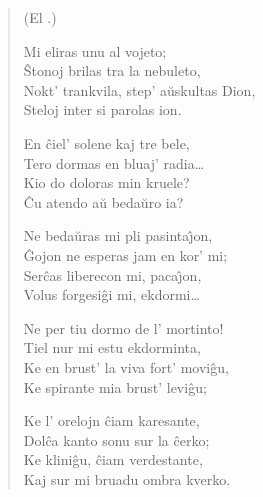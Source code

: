\begin{verse}
\begin{center}
\footnotesize (El .)
\end{center}
                  \vin  Mi eliras unu al vojeto;\\
                  \^Stonoj brilas tra la nebuleto,\\
                  Nokt' trankvila, step' a\u uskultas Dion,\\
                  Steloj inter si parolas ion.

                  \vin  En \^ciel' solene kaj tre bele,\\
                  Tero dormas en bluaj' radia\dots\\
                  Kio do doloras min kruele?\\
                  \^Cu atendo a\u u beda\u uro ia?

                    Ne beda\u uras mi pli pasinta\^{\j}on,\\
                  \^Gojon ne esperas jam en kor' mi;\\
                  Ser\^cas liberecon mi, paca\^{\j}on,\\
                  Volus forgesi\^gi mi, ekdormi\dots

                  \vin  Ne per tiu dormo de l' mortinto!\\
                  Tiel nur mi estu ekdorminta,\\
                  Ke en brust' la viva fort' movi\^gu,\\
                  Ke spirante mia brust' levi\^gu;
                 
                   \vin Ke l' orelojn \^ciam karesante,\\
                  Dol\^ca kanto sonu sur la \^cerko;\\
                  Ke klini\^gu, \^ciam verdestante,\\
                  Kaj sur mi bruadu ombra kverko.
\end{verse}

\smallrule{}